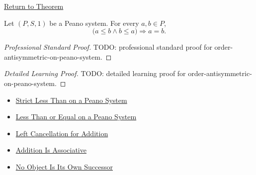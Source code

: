 \newpage
{}
\label{prf:order-antisymmetric-on-peano-system}

\begin{remark*}[Return]
\hyperref[thm:order-antisymmetric-on-peano-system]{Return to Theorem}
\end{remark*}

\begin{theorem*}
Let $(P,S,1)$ be a Peano system. For every $a,b \in P$,
\[
\bigl(a \le b \land b \le a\bigr)
\Longrightarrow
a=b.
\]
\end{theorem*}

\begin{proof}[Professional Standard Proof]
\LRAProofBodyStart
TODO: professional standard proof for order-antisymmetric-on-peano-system.
\end{proof}

\begin{proof}[Detailed Learning Proof]
\LRAProofBodyStart
TODO: detailed learning proof for order-antisymmetric-on-peano-system.
\end{proof}

\begin{remark*}
\end{remark*}

\begin{dependencies}
\begin{itemize}
  \item \hyperref[def:strict-less-than-on-peano-system]{Strict Less Than on a Peano System}
  \item \hyperref[def:less-than-or-equal-on-peano-system]{Less Than or Equal on a Peano System}
  \item \hyperref[thm:addition-left-cancellation]{Left Cancellation for Addition}
  \item \hyperref[thm:addition-associative]{Addition Is Associative}
  \item \hyperref[thm:no-object-is-its-own-successor]{No Object Is Its Own Successor}
\end{itemize}
\end{dependencies}

\clearpage
